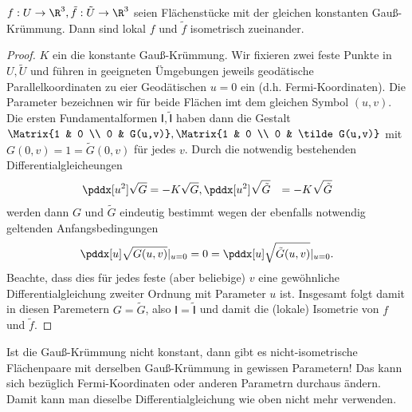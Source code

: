 \begin{st}
	$f: U \to \R^3, \tilde f: \tilde U \to \R^3$ seien Flächenstücke mit der gleichen konstanten Gauß-Krümmung.
	Dann sind lokal $f$ und $\tilde f$ isometrisch zueinander.
	\begin{proof}
		$K$ ein die konstante Gauß-Krümmung.
		Wir fixieren zwei feste Punkte in $U, \tilde U$ und führen in geeigneten Ümgebungen jeweils geodätische Parallelkoordinaten zu eier Geodätischen $u = 0$ ein (d.h. Fermi-Koordinaten).
		Die Parameter bezeichnen wir für beide Flächen imt dem gleichen Symbol $(u, v)$.
		Die ersten Fundamentalformen $Ⅰ, \tilde Ⅰ$ haben dann die Gestalt $\Matrix{1 & 0 \\ 0 & G(u,v)}, \Matrix{1 & 0 \\ 0 & \tilde G(u,v)}$
		mit $G(0,v) = 1 = \tilde G(0,v)$ für jedes $v$.
		Durch die notwendig bestehenden Differentialgleicheungen
		\begin{align*}
			\pddx[u^2] \sqrt G &= - K \sqrt G,
			\pddx[u^2] \sqrt{\tilde G} &= - K \sqrt{\tilde G}
		\end{align*}
		werden dann $G$ und $\tilde G$ eindeutig bestimmt wegen der ebenfalls notwendig geltenden Anfangsbedingungen
		\[
			\pddx[u] \sqrt{G(u,v)}|_{u=0}
			= 0 =
			\pddx[u] \sqrt{\tilde G(u,v)}|_{u=0}.
		\]
		Beachte, dass dies für jedes feste (aber beliebige) $v$ eine gewöhnliche Differentialgleichung zweiter Ordnung mit Parameter $u$ ist.
		Insgesamt folgt damit in diesen Paremetern $G = \tilde G$, also $Ⅰ = \tilde Ⅰ$ und damit die (lokale) Isometrie von $f$ und $\tilde f$.
	\end{proof}
	\begin{note}
		Ist die Gauß-Krümmung nicht konstant, dann gibt es nicht-isometrische Flächenpaare mit derselben Gauß-Krümmung in gewissen Parametern!
		Das kann sich bezüglich Fermi-Koordinaten oder anderen Parametrn durchaus ändern.
		Damit kann man dieselbe Differentialgleichung wie oben nicht mehr verwenden.
	\end{note}
\end{st}


